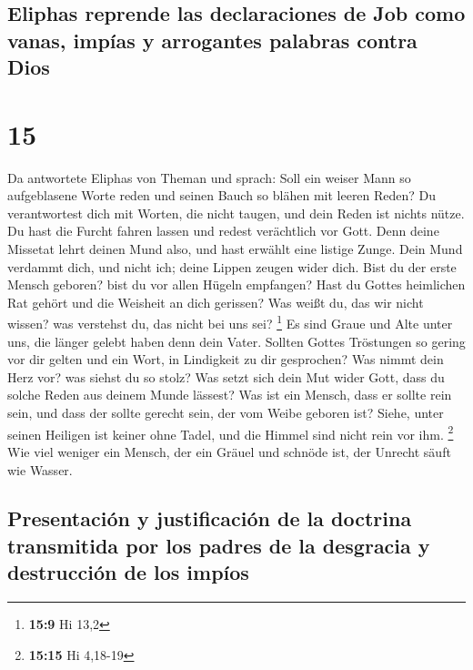 \hypertarget{eliphas-reprende-las-declaraciones-de-job-como-vanas-impuxedas-y-arrogantes-palabras-contra-dios}{%
\subsection{Eliphas reprende las declaraciones de Job como vanas, impías
y arrogantes palabras contra
Dios}\label{eliphas-reprende-las-declaraciones-de-job-como-vanas-impuxedas-y-arrogantes-palabras-contra-dios}}

\hypertarget{section-14}{%
\section{15}\label{section-14}}

 Da antwortete Eliphas von Theman und sprach:
 Soll ein weiser Mann so aufgeblasene Worte reden und
seinen Bauch so blähen mit leeren Reden?  Du verantwortest
dich mit Worten, die nicht taugen, und dein Reden ist nichts nütze.
 Du hast die Furcht fahren lassen und redest verächtlich
vor Gott.  Denn deine Missetat lehrt deinen Mund also, und
hast erwählt eine listige Zunge.  Dein Mund verdammt dich,
und nicht ich; deine Lippen zeugen wider dich.  Bist du
der erste Mensch geboren? bist du vor allen Hügeln empfangen?
 Hast du Gottes heimlichen Rat gehört und die Weisheit an
dich gerissen?  Was weißt du, das wir nicht wissen? was
verstehst du, das nicht bei uns sei? \footnote{\textbf{15:9} Hi 13,2}
 Es sind Graue und Alte unter uns, die länger gelebt
haben denn dein Vater.  Sollten Gottes Tröstungen so
gering vor dir gelten und ein Wort, in Lindigkeit zu dir gesprochen?
 Was nimmt dein Herz vor? was siehst du so stolz?
 Was setzt sich dein Mut wider Gott, dass du solche Reden
aus deinem Munde lässest?  Was ist ein Mensch, dass er
sollte rein sein, und dass der sollte gerecht sein, der vom Weibe
geboren ist?  Siehe, unter seinen Heiligen ist keiner
ohne Tadel, und die Himmel sind nicht rein vor ihm. \footnote{\textbf{15:15}
  Hi 4,18-19}  Wie viel weniger ein Mensch, der ein
Gräuel und schnöde ist, der Unrecht säuft wie Wasser.

\hypertarget{presentaciuxf3n-y-justificaciuxf3n-de-la-doctrina-transmitida-por-los-padres-de-la-desgracia-y-destrucciuxf3n-de-los-impuxedos}{%
\subsection{Presentación y justificación de la doctrina transmitida por
los padres de la desgracia y destrucción de los
impíos}\label{presentaciuxf3n-y-justificaciuxf3n-de-la-doctrina-transmitida-por-los-padres-de-la-desgracia-y-destrucciuxf3n-de-los-impuxedos}}

